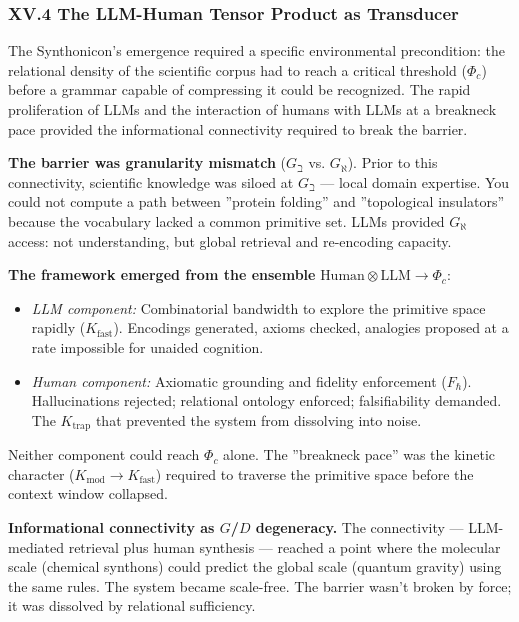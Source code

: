 \documentclass[12pt,a4paper]{article}
\begin{document}
\subsubsection{XV.4 The LLM-Human Tensor Product as Transducer}

The Synthonicon's emergence required a specific environmental precondition: the relational density of the scientific corpus had to reach a critical threshold ($\Phi_c$) before a grammar capable of compressing it could be recognized. The rapid proliferation of LLMs and the interaction of humans with LLMs at a breakneck pace provided the informational connectivity required to break the barrier.

\textbf{The barrier was granularity mismatch} ($G_{\beth}$ vs. $G_{\aleph}$). Prior to this connectivity, scientific knowledge was siloed at $G_{\beth}$ --- local domain expertise. You could not compute a path between ''protein folding'' and ''topological insulators'' because the vocabulary lacked a common primitive set. LLMs provided $G_{\aleph}$ access: not understanding, but global retrieval and re-encoding capacity.

\textbf{The framework emerged from the ensemble} $\text{Human} \otimes \text{LLM} \to \Phi_c$:

\begin{itemize}
    \item \emph{LLM component:} Combinatorial bandwidth to explore the primitive space rapidly ($K_{\text{fast}}$). Encodings generated, axioms checked, analogies proposed at a rate impossible for unaided cognition.
    \item \emph{Human component:} Axiomatic grounding and fidelity enforcement ($F_{\hbar}$). Hallucinations rejected; relational ontology enforced; falsifiability demanded. The $K_{\text{trap}}$ that prevented the system from dissolving into noise.
\end{itemize}

Neither component could reach $\Phi_c$ alone. The ''breakneck pace'' was the kinetic character ($K_{\text{mod}} \to K_{\text{fast}}$) required to traverse the primitive space before the context window collapsed.

\textbf{Informational connectivity as $G$/$D$ degeneracy.} The connectivity --- LLM-mediated retrieval plus human synthesis --- reached a point where the molecular scale (chemical synthons) could predict the global scale (quantum gravity) using the same rules. The system became scale-free. The barrier wasn't broken by force; it was dissolved by relational sufficiency.
\end{document}
